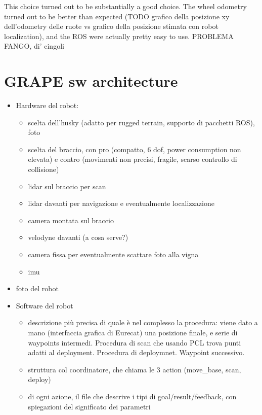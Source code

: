 This choice turned out to be substantially a good choice. The wheel odometry turned out to be  better than expected (TODO grafico della posizione xy dell'odometry delle ruote vs grafico della posizione stimata con robot localization), and the \ac{ROS} were actually pretty easy to use. PROBLEMA FANGO, di' cingoli

\section{GRAPE sw architecture}\label{sec:grapeSwArch}


\begin{itemize}
\item Hardware del robot:
		\begin{itemize}
			\item scelta dell'husky (adatto per rugged terrain, supporto di pacchetti ROS), foto
			\item scelta del braccio, con pro (compatto, 6 dof, power consumption non elevata) e contro (movimenti non precisi, fragile, scarso controllo di collisione)
			\item lidar sul braccio per scan
			\item lidar davanti per navigazione e eventualmente localizzazione
			\item camera montata sul braccio
			\item velodyne davanti (a cosa serve?)
			\item camera fissa per eventualmente scattare foto alla vigna
			\item imu
		\end{itemize}
	\item foto del robot 

\item Software del robot
	\begin{itemize}
		\item descrizione più precisa di quale è nel complesso la procedura: viene dato a mano (interfaccia grafica di Eurecat) una posizione finale, e serie di waypoints intermedi. Procedura di scan che usando PCL trova punti adatti al deployment. Procedura di deploymnet. Waypoint successivo.
		\item struttura col coordinatore, che chiama le 3 action (move\_base, scan, deploy)
		\item di ogni azione, il file che descrive i tipi di goal/result/feedback, con spiegazioni del significato dei parametri
	\end{itemize}
\end{itemize}
